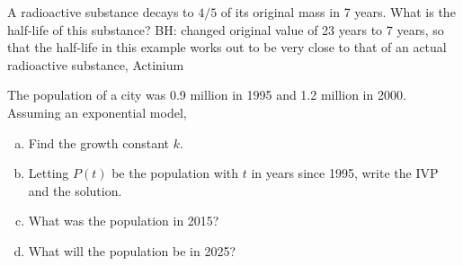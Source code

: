 \documentclass[12pt]{book}
\begin{document}

\begin{exercise}
A radioactive substance decays to $4/5$ of its original mass in 
{\color{blue}7} years. What is the half-life of this 
substance?
{\color{teal}BH: changed original value of 23 years to 7 years, 
so that the half-life in this example
works out to be very close to that of an actual radioactive 
substance, Actinium}

\end{exercise}



\begin{exercise}
The population of a city was 0.9 million in 1995 and 1.2 million in 2000. Assuming an exponential model,
\begin{enumerate}[a)]
    \item Find the growth constant $k$.
    \item Letting $P(t)$ be the population with $t$ in years since 1995, write the IVP and the solution. 
    \item What was the population in 2015?
    \item What will the population be in 2025?
\end{enumerate}
\end{exercise}

\end{document}
